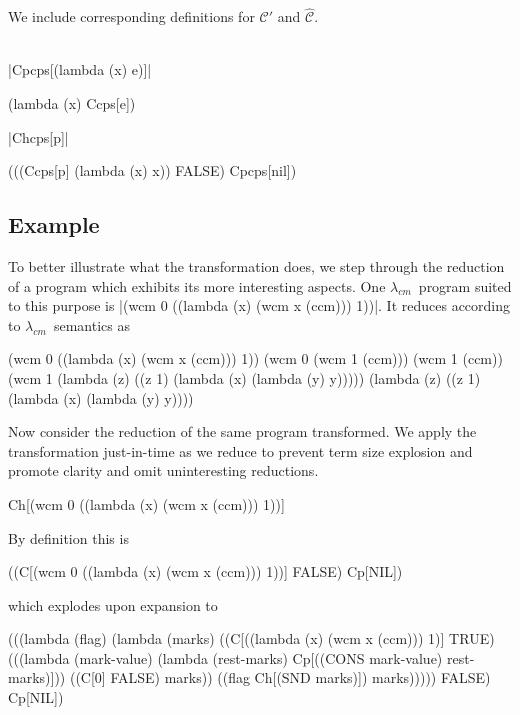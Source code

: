 \documentclass{llncs}
\newcommand{\cm}[0]{$\lambda_{cm}$}
\begin{document}
We include corresponding definitions for $\mathcal{C}'$ and $\hat{\mathcal{C}}$.
\\
\\
\noindent
\begin{minipage}{0.5\linewidth}
\begin{schemedefn}{\scheme|Cpcps[(lambda (x) e)]|}
\begin{schemedisplay}
(lambda (x) Ccps[e])
\end{schemedisplay}
\end{schemedefn}
\end{minipage}
\begin{minipage}{0.5\linewidth}
\begin{schemedefn}{\scheme|Chcps[p]|}
\begin{schemedisplay}
(((Ccps[p] (lambda (x) x)) FALSE) Cpcps[nil])
\end{schemedisplay}
\end{schemedefn}
\end{minipage}

\subsection{Example}

To better illustrate what the transformation does, we step through the reduction of a program which exhibits its more interesting aspects. One \cm\ program suited to this purpose is \scheme|(wcm 0 ((lambda (x) (wcm x (ccm))) 1))|. It reduces according to \cm\ semantics as
\begin{schemedisplay}
(wcm 0 ((lambda (x) (wcm x (ccm))) 1))
(wcm 0 (wcm 1 (ccm)))
(wcm 1 (ccm))
(wcm 1 (lambda (z) ((z 1) (lambda (x) (lambda (y) y)))))
(lambda (z) ((z 1) (lambda (x) (lambda (y) y))))
\end{schemedisplay}

Now consider the reduction of the same program transformed. We apply the transformation just-in-time as we reduce to prevent term size explosion and promote clarity and omit uninteresting reductions.
\begin{schemedisplay}
Ch[(wcm 0 ((lambda (x) (wcm x (ccm))) 1))]
\end{schemedisplay}

By definition this is
\begin{schemedisplay}
((C[(wcm 0 ((lambda (x) (wcm x (ccm))) 1))] FALSE) Cp[NIL])
\end{schemedisplay}
which explodes upon expansion to
\begin{schemedisplay}
(((lambda (flag)
    (lambda (marks)
      ((C[((lambda (x) (wcm x (ccm))) 1)] TRUE)
       (((lambda (mark-value) (lambda (rest-marks) Cp[((CONS mark-value) rest-marks)]))
         ((C[0] FALSE) marks)) ((flag Ch[(SND marks)]) marks)))))
  FALSE) Cp[NIL])
\end{schemedisplay}
\end{document}
